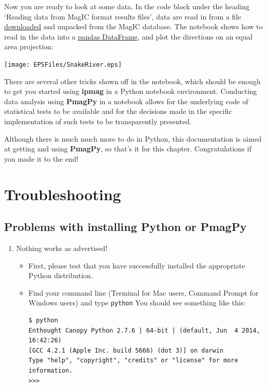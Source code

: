 \documentclass[11pt]{book}
\begin{document}
{{{{{{
 Now you are ready to look at some data.  In the code block under the heading `Reading data from MagIC format results files',  data are read in from a file \href{#magic_download}{downloaded} and unpacked from the MagIC database.   The notebook shows how to read in the data into a \href{#pandas}{pandas DataFrame}, and plot the directions on an equal area projection:

\texttt{[image: EPSFiles/SnakeRiver.eps]}

There are several other tricks shown off in the notebook, which should be enough to get you started using {\bf ipmag} in a Python notebook environment.  Conducting data analysis  using {\bf PmagPy} in a notebook allows for the underlying code of statistical tests to be available and for the decisions made in the specific implementation of such tests to be transparently presented.

Although there is much much more to do in Python, this documentation is aimed at getting and using {\bf PmagPy}, so that's it for this chapter. Congratulations if you made it to the end!


\chapter{Troubleshooting}
\label{chap:trouble}

\section{Problems with installing Python or PmagPy}

\begin{enumerate}

 \item Nothing works as advertised!


  \begin{itemize}

 \item First, please test that you have successfully installed the appropriate Python distribution.

 \item Find your command line (Terminal for Mac users, Command Prompt for Windows users) and type \texttt{python}  You should see something like this:


\begin{verbatim}$ python
Enthought Canopy Python 2.7.6 | 64-bit | (default, Jun  4 2014, 16:42:26)
[GCC 4.2.1 (Apple Inc. build 5666) (dot 3)] on darwin
Type "help", "copyright", "credits" or "license" for more information.
>>>
\end{verbatim}


\end{itemize}
\end{enumerate}}}}}}}
\end{document}
